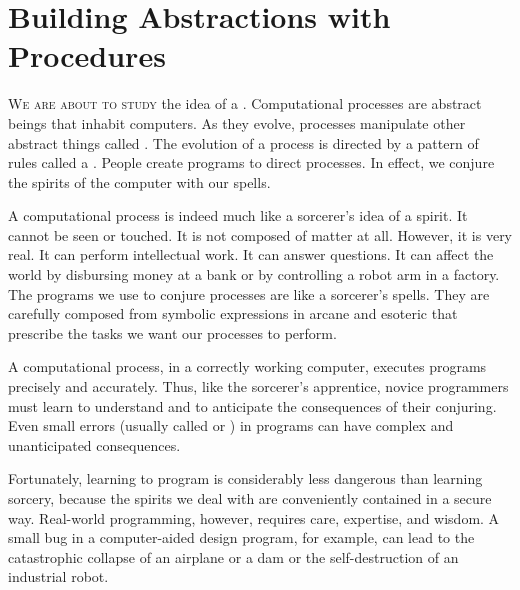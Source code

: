 \chapter{Building Abstractions with Procedures}
\label{Chapter 1}


\vspace{2em}

\lettrine[findent=1pt]{W}{e are about to study} the idea of a .
Computational processes are abstract beings that inhabit computers.
As they evolve, processes manipulate other abstract things called .
The evolution of a process is directed by a pattern of rules called a .
People create programs to direct processes.
In effect, we conjure the spirits of the computer with our spells.

A computational process is indeed much like a sorcerer’s idea of a spirit.
It cannot be seen or touched.
It is not composed of matter at all.
However, it is very real.
It can perform intellectual work.
It can answer questions.
It can affect the world by disbursing money at a bank or by controlling a robot arm in a factory.
The programs we use to conjure processes are like a sorcerer’s spells.
They are carefully composed from symbolic expressions in arcane and esoteric  that prescribe the tasks we want our processes to perform.

A computational process, in a correctly working computer, executes programs precisely and accurately.
Thus, like the sorcerer’s apprentice, novice programmers must learn to understand and to anticipate the consequences of their conjuring.
Even small errors (usually called  or ) in programs can have complex and unanticipated consequences.

Fortunately, learning to program is considerably less dangerous than learning sorcery, because the spirits we deal with are conveniently contained in a secure way.
Real-world programming, however, requires care, expertise, and wisdom.
A small bug in a computer-aided design program, for example, can lead to the catastrophic collapse of an airplane or a dam or the self-destruction of an industrial robot.

